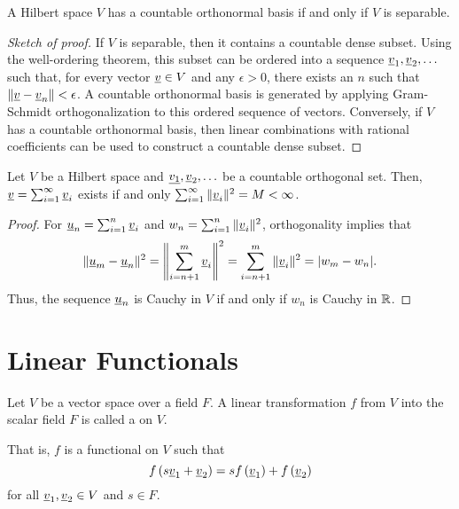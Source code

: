 \begin{theorem} \label{theorem:SeparableHilbertSpace}
A Hilbert space $V$ has a countable orthonormal basis if and only if $V$ is separable.
\end{theorem}
\begin{proof}[Sketch of proof]
If $V$ is separable, then it contains a countable dense subset.
Using the well-ordering theorem, this subset can be ordered into a sequence $\underline{v}_1 , \underline{v}_2 , \ldots$ such that, for every vector $\underline{v}\in V$ and any $\epsilon>0$, there exists an $n$ such that $\left\| \underline{v} - \underline{v}_n \right\| < \epsilon$.
A countable orthonormal basis is generated by applying Gram-Schmidt orthogonalization to this ordered sequence of vectors.
Conversely, if $V$ has a countable orthonormal basis, then linear combinations with rational coefficients can be used to construct a countable dense subset.
\end{proof}

\begin{lemma} \label{lem:hilbert_sum_convergence}
Let $V$ be a Hilbert space and $\underline{v_1},\underline{v}_2,\ldots$ be a countable orthogonal set.
Then, $\underline{v} = \sum_{i=1}^\infty \underline{v}_i$ exists if and only $\sum_{i=1}^\infty \|\underline{v}_i\|^2 = M < \infty$.
\end{lemma}
\begin{proof}
For $\underline{u}_n = \sum_{i=1}^n \underline{v}_i$ and $w_n = \sum_{i=1}^n \|\underline{v}_i\|^2$, orthogonality implies that
\[\|\underline{u}_m - \underline{u}_n\|^2 = \left\| \sum_{i=n+1}^m \underline{v}_i \right\|^2 = \sum_{i=n+1}^m \|\underline{v}_i \|^2 = | w_m - w_n|. \]
Thus, the sequence $\underline{u}_n$ is Cauchy in $V$ if and only if $w_n$ is Cauchy in $\mathbb{R}$.
\end{proof}


\section{Linear Functionals}

\begin{definition}
Let $V$ be a vector space over a field $F$.
A linear transformation $f$ from $V$ into the scalar field $F$ is called a  on $V$.
\end{definition}
That is, $f$ is a functional on $V$ such that
\begin{equation*}
f \left( s \underline{v}_1 + \underline{v}_2 \right)
= s f \left( \underline{v}_1 \right) + f \left( \underline{v}_2 \right)
\end{equation*}
for all $\underline{v}_1, \underline{v}_2 \in V$ and $s \in F$.

